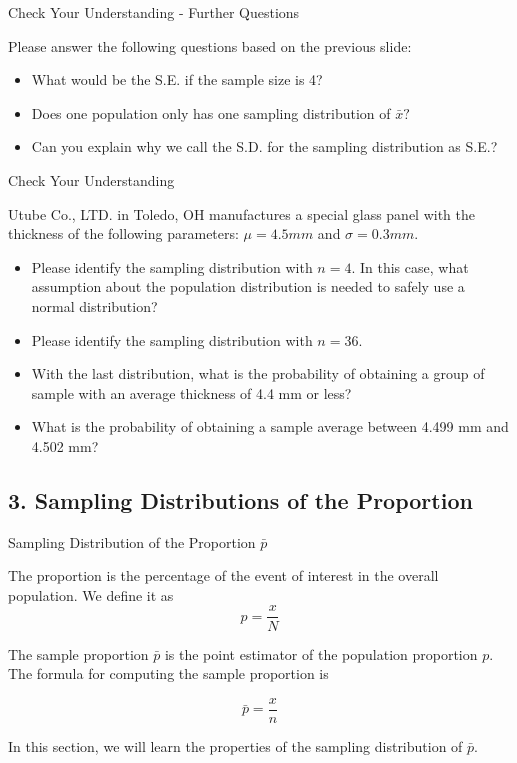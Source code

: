 \documentclass{beamer}
\begin{document}
\begin{frame}{Check Your Understanding - Further Questions}

Please answer the following questions based on the previous slide: 
\begin{itemize}
\item What would be the S.E. if the sample size is 4? 
\item Does one population only has one sampling distribution of $\bar{x}?$
\item Can you explain why we call the S.D. for the sampling distribution as S.E.? 
\end{itemize}


\end{frame}


\begin{frame}{Check Your Understanding}

Utube Co., LTD. in Toledo, OH manufactures a special glass panel with the thickness of the following parameters: $\mu = 4.5 mm$ and $\sigma = 0.3 mm$. 
\begin{itemize}
\item Please identify the sampling distribution with $n=4$. In this case, what assumption about the population distribution is needed to safely use a normal distribution? 
\item Please identify the sampling distribution with $n = 36$. 
\item With the last distribution, what is the probability of obtaining a group of sample with an average thickness of 4.4 mm or less? 
\item What is the probability of obtaining a sample average between 4.499 mm and 4.502 mm? 
\end{itemize}

\end{frame}


\subsection{3. Sampling Distributions of the Proportion}
\begin{frame}
\subsectionpage
\end{frame}


\begin{frame}{Sampling Distribution of the Proportion $\bar{p}$}

The proportion is the percentage of the event of interest in the overall population. We define it as $$p = \frac{x}{N}$$

\vspace{0.3cm}
The sample proportion $\bar{p}$ is the point estimator of the population proportion $p$. The formula for computing the sample proportion is 

$$\bar{p} = \frac{x}{n}$$

\vspace{0.3 cm}
In this section, we will learn the properties of the sampling distribution of $\bar{p}$.

\end{frame}
\end{document}
